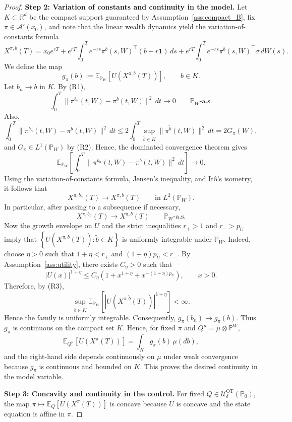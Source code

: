 \documentclass[11pt]{article}
\theoremstyle{definition}
\begin{document}
\begin{proof}
\textbf{Step 2: Variation of constants and continuity in the model.} 
Let $K\subset\mathbb{R}^d$ be the compact support guaranteed by Assumption~\ref{ass:compact_B}, fix $\pi\in\mathcal{A}'(x_0)$, and note that the linear wealth dynamics yield the variation-of-constants formula
\begin{equation}\label{Eq_VIC1}
{}
{X^{\pi,b}(T)} = x_0e^{rT} + e^{rT}\int_0^T e^{-rs}{\pi^b(s,W)}^\top(b-r\mathbf{1})\,ds + e^{rT}\int_0^T e^{-rs}{\pi^b(s,W)}^\top\sigma\,dW(s).
\end{equation}
{We define the map
\[
g_\pi(b):=\mathbb E_{\mathbb P_W}\!\left[U\!\left(X^{\pi,b}(T)\right)\right], \qquad b\in K.
\]
Let $b_n\to b$ in $K$. By (R1),
\[
\int_0^T \|\pi^{b_n}(t,W)-\pi^b(t,W)\|^2\,dt \to 0
\qquad \mathbb P_W\text{-a.s.}
\]
Also,
\[
\int_0^T \|\pi^{b_n}(t,W)-\pi^b(t,W)\|^2\,dt
\le
2\int_0^T \sup_{\tilde b\in K}\|\pi^{\tilde b}(t,W)\|^2\,dt
=
2G_\pi(W),
\]
and $G_\pi\in L^1(\mathbb P_W)$ by (R2). Hence, the dominated convergence theorem gives
\[
\mathbb E_{\mathbb P_W}\!\left[\int_0^T
\|\pi^{b_n}(t,W)-\pi^b(t,W)\|^2\,dt\right]\to 0.
\]
Using the variation-of-constants formula, Jensen's inequality, and It\^o's isometry, 
it follows that
\[
X^{\pi,b_n}(T) \to X^{\pi,b}(T)
\qquad\text{in }L^2(\mathbb P_W).
\]
In particular, after passing to a subsequence if necessary,
\[
X^{\pi,b_n}(T) \to X^{\pi,b}(T)
\qquad \mathbb P_W\text{-a.s.}
\]
Now the growth envelope on $U$ and the strict inequalities
$r_+>1$ and $r_->p_U$ imply that $\left\{U\!\left(X^{\pi,\widetilde b}(T)\right):
\widetilde b\in K\right\}$
is uniformly integrable under $\mathbb{P}_W$. Indeed, choose
$\eta>0$ such that $1+\eta<r_+$ and $(1+\eta)p_U<r_-.$
By Assumption~\ref{ass:utility}, there exists $C_\eta>0$ such that
\[
|U(x)|^{1+\eta}
\le
C_\eta\left(
1+x^{1+\eta}+x^{-(1+\eta)p_U}
\right),
\qquad x>0.
\]
Therefore, by (R3),
\[
\sup_{\widetilde b\in K}
\mathbb{E}_{\mathbb{P}_W}
\left[
\left|U\!\left(X^{\pi,\widetilde b}(T)\right)\right|^{1+\eta}
\right]
<\infty.
\]
Hence the family is uniformly integrable. Consequently,
$g_\pi(b_n)\to g_\pi(b)$.} 
Thus $g_\pi$ is continuous on the compact set $K$.
{Hence, for fixed \(\pi\) and \({Q}^\mu=\mu\otimes \mathbb{P}^W\),
\[
\mathbb{E}_{{Q}^\mu}[U(X^\pi(T))]
=
\int_K g_\pi(b)\,\mu(db),
\]
and the right-hand side depends continuously on \(\mu\) under weak convergence because
\(g_\pi\) is continuous and bounded on \(K\).} 
This proves the desired continuity in the model variable.

\textbf{Step 3: Concavity and continuity in the control.}
For fixed ${Q} \in \mathcal{U}^{\text{OT}}_{\delta}(\mathbb{P}_0)$, the map
$\pi \mapsto \mathbb{E}_{Q}[U(X^\pi(T))]$ is concave because $U$ is concave
and the state equation is affine in $\pi$.


\end{proof}
\end{document}
